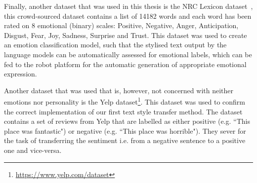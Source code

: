 \documentclass[nomenclature, english, biblatex]{kththesis}
\begin{document}
Finally, another dataset that was used in this thesis is the NRC Lexicon dataset~\cite{mohammad2013crowdsourcing}, this crowd-sourced dataset contains a list of 14182 words and each word has been rated on 8 emotional (binary) scales: Positive, Negative, Anger, Anticipation, Disgust, Fear, Joy, Sadness, Surprise and Trust. This dataset was used to create an emotion classification model, such that the stylised text output by the language models can be automatically assessed for emotional labels, which can be fed to the robot platform for the automatic generation of appropriate emotional expression.

Another dataset that was used that is, however, not concerned with neither emotions nor personality is the Yelp dataset\footnote{\url{https://www.yelp.com/dataset}}. This dataset was used to confirm the correct implementation of our first text style transfer method. The dataset contains a set of reviews from Yelp that are labelled as either positive (e.g. ``This place was fantastic") or negative (e.g. ``This place was horrible"). They sever for the task of transferring the sentiment i.e. from a negative sentence to a positive one and vice-versa.
\end{document}
